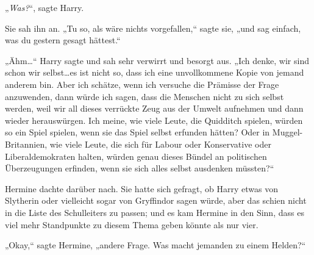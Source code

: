 „\emph{Was?}“, sagte Harry.

Sie sah ihn an. „Tu so, als wäre nichts vorgefallen,“ sagte sie, „und sag einfach, was du gestern gesagt hättest.“

„Ähm…“ Harry sagte und sah sehr verwirrt und besorgt aus. „Ich denke, wir sind schon wir selbst…es ist nicht so, dass ich eine unvollkommene Kopie von jemand anderem bin. Aber ich schätze, wenn ich versuche die Prämisse der Frage anzuwenden, dann würde ich sagen, dass die Menschen nicht zu sich selbst werden, weil wir all dieses verrückte Zeug aus der Umwelt aufnehmen und dann wieder herauswürgen. Ich meine, wie viele Leute, die Quidditch spielen, würden so ein Spiel spielen, wenn sie das Spiel selbst erfunden hätten? Oder in Muggel-Britannien, wie viele Leute, die sich für Labour oder Konservative oder Liberaldemokraten halten, würden genau dieses Bündel an politischen Überzeugungen erfinden, wenn sie sich alles selbst ausdenken müssten?“

Hermine dachte darüber nach. Sie hatte sich gefragt, ob Harry etwas von Slytherin oder vielleicht sogar von Gryffindor sagen würde, aber das schien nicht in die Liste des Schulleiters zu passen; und es kam Hermine in den Sinn, dass es viel mehr Standpunkte zu diesem Thema geben könnte als nur vier.

„Okay,“ sagte Hermine, „andere Frage. Was macht jemanden zu einem Helden?“

